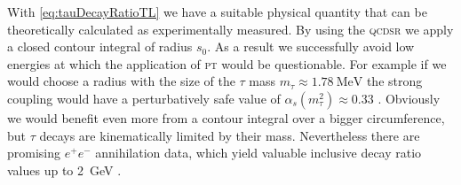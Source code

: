 \documentclass[../../index.tex]{subfiles}
\begin{document}
With \cref{eq:tauDecayRatioTL} we have a suitable physical quantity that can be
theoretically calculated as experimentally measured. By using the \textsc{qcdsr}
we apply a closed contour integral of radius \(s_0\). As a result we
successfully avoid low energies at which the application of \textsc{pt} would
be questionable. For example if we would choose a radius with the size of the
\(\tau\) mass \(m_\tau \approx \SI{1.78}{\mega\eV}\) the strong coupling would
have a perturbatively safe value of \(\alpha_s(m_\tau^2)\approx 0.33\)
\cite{Pich2016}. Obviously we would benefit even more from a contour integral
over a bigger circumference, but \(\tau\) decays are kinematically limited by
their mass. Nevertheless there are promising \(e^+e^-\) annihilation data, which
yield valuable inclusive decay ratio values up to \SI{2}{\giga\eV}
\cite{Boito2018}\cite{Keshavarzi2018}.
\end{document}
